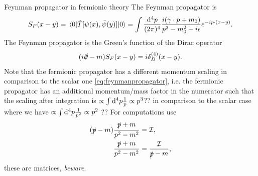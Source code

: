 \begin{mybox}{Feynman propagator in fermionic theory}
	The Feynman propagator is
	\begin{equation}
	\label{eq:feynmanpropagatorFermions}
	S_F(x-y) = \expval{\hat{T}[\psi(x),\bar{\psi}(y)]}{0} = \int \frac{\mathrm{d}^4 p}{(2 \pi)^4} \frac{i (\gamma \cdot p +m_0)}{p^2-m^2_0 +i\epsilon} e^{-i p \cdot (x-y)}.
	\end{equation}
	The Feynman propagator is the Green's function of the Dirac operator 
	\begin{equation}
		(i \slashed{\partial} -m) S_F(x-y) = i \delta^{(4)}_D(x-y).
	\end{equation}
	Note that the fermionic propagator has a different momentum scaling in comparison to the scalar one \ref{eq:feynmanpropagator}, i.e. the fermionic propagator has an additional momentum/mass factor in the numerator such that the scaling after integration is $\propto \int \mathrm{d}^4p \frac{1}{p} \propto p^3$?? in comparison to the scalar case where we have $\propto \int \mathrm{d}^4p \frac{1}{p^2}\propto p^2$ ??
	For computations use
	\begin{align}
		(\slashed{p}-m) \frac{\slashed{p}+m}{p^2-m^2} &= \mathcal{I}, \\
		\frac{\slashed{p}+m}{p^2-m^2} &= \frac{\mathcal{I}}{\slashed{p} -m},
	\end{align}
these are matrices, \emph{beware}.
\end{mybox}





